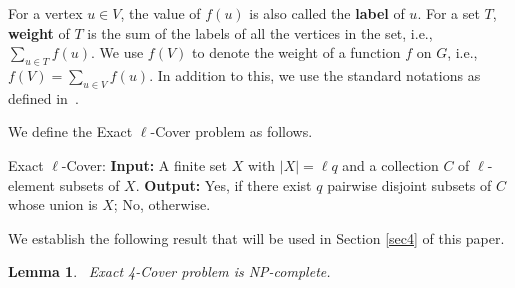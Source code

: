 \documentclass[preprint,12pt]{elsarticle}
\newcommand{\xthc}{{\sc Exact 3-Cover}}
\newcommand{\xfc}{{\sc Exact 4-Cover}}
\newcommand{\xlc}{{\sc Exact $\ell$-Cover}}
\newtheorem{lemma}{Lemma}
\begin{document}
For a vertex $u \in V$, the value of $f(u)$ is also called the \textbf{label} of $u$. For a set $T$, \textbf{weight} of $T$ is the sum of the labels of all the vertices in the set, i.e., $\sum\limits_{u \in T} f(u)$. We use $f(V)$ to denote the weight of a function $f$ on $G$, i.e., $f(V) = \sum\limits_{u \in V} f(u)$. In addition to this, we use the standard notations as defined in~\cite{WEST}.

\medskip
\noindent We define the \xlc{} problem as follows.
\begin{tcolorbox}
    \xlc: \newline
    \textbf{Input:} A finite set $X$ with $|X| = \ell q$ and a collection $C$ of $\ell$-element subsets of $X$. \newline
\textbf{Output:} Yes, if there exist $q$ pairwise disjoint subsets of $C$ whose union is $X$; No, otherwise.
\end{tcolorbox}
We establish the following result that will be used in Section \ref{sec4} of this paper.
\begin{lemma}~\label{x4cproof}
    \xfc{} problem is NP-complete.
\end{lemma}
\end{document}
